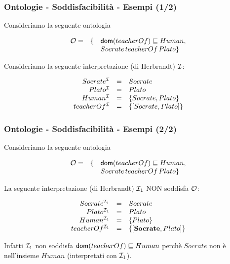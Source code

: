 \documentclass[8pt]{beamer}
\begin{document}
\begin{frame}
  \frametitle{Ontologie - Soddisfacibilit\`a - Esempi (1/2)}
  
  Consideriamo la seguente ontologia
\begin{small}
\[
  \begin{array}{cll}
    \mathcal{O} = & \{ & \mathsf{dom}(teacherOf) \sqsubseteq Human, \\
    && Socrate\,teacherOf\,Plato \}
  \end{array} 
\]
\end{small}

Consideriamo la seguente interpretazione (di Herbrandt) $\mathcal{I}$: 
\begin{small}
\[
  \begin{array}{rcl}
    Socrate^{\mathcal{I}} & = & Socrate\\ 
    Plato^{\mathcal{I}} & = & Plato\\
    Human^{\mathcal{I}} & = & \{Socrate, Plato\}\\
    teacherOf^{\mathcal{I}} & = & \{ [Socrate, Plato] \}
  \end{array}
\]
\end{small}

\vspace{\baselineskip}

\end{frame}

\begin{frame}
  \frametitle{Ontologie - Soddisfacibilit\`a - Esempi (2/2)}
  
  Consideriamo la seguente ontologia
\begin{small}
\[
  \begin{array}{cll}
    \mathcal{O} = & \{ & \mathsf{dom}(teacherOf) \sqsubseteq Human, \\
    && Socrate\,teacherOf\,Plato \}
  \end{array} 
\]
\end{small}

La seguente interpretazione (di Herbrandt) $\mathcal{I}_1$ NON soddisfa $\mathcal{O}$: 
\begin{small}
\[
  \begin{array}{rcl}
    Socrate^{\mathcal{I}_1} & = & Socrate\\ 
    Plato^{\mathcal{I}_1} & = & Plato\\
    Human^{\mathcal{I}_1} & = & \{Plato\}\\
    teacherOf^{\mathcal{I}_1} & = & \{ [\textbf{Socrate}, Plato] \}
  \end{array}
\]
\end{small}

Infatti $\mathcal{I}_1$ non soddisfa $\mathsf{dom}(teacherOf) \sqsubseteq Human$ perch\`e $Socrate$ non
\`e nell'insieme $Human$ (interpretati con $\mathcal{I}_1$).
\end{frame}
\end{document}
